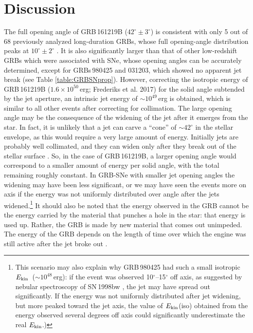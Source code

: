 \documentclass[fleqn,usenatbib]{mnras}
\newcommand{\KE}{$E_{\rm kin}$}
\begin{document}
\section{Discussion}
The full opening angle of GRB\,161219B ($42^\circ \pm 3^\circ$) is consistent with only 5 out of 68 previously analyzed 
long-duration GRBs, whose full opening-angle distribution peaks at 
$10^\circ \pm 2^\circ$ \citep{Fong14}. 
It is also significantly larger than that of other low-redshift 
GRBs which were associated with SNe, whose opening angles can be accurately determined, except for GRBs\,980425 and 
031203, which showed no apparent jet break (see Table \ref{table:GRBSNprop}).  
However, correcting the isotropic 
energy of GRB\,161219B ($1.6 \times 10^{50}$\,erg; Frederiks et al. 2017) for the solid 
angle subtended by the jet aperture, an intrinsic jet energy of 
$\sim 10^{49}$\,erg is obtained, which is similar to all other events after
correcting for collimation.  
The large opening angle may be
the consequence of the widening of the jet after it emerges from the star. In
fact, it is unlikely that a jet can carve a ``cone'' of $\sim 42^\circ$ in the
stellar envelope, as this would require a very large amount of energy. Initially
jets are probably well collimated, and they can widen only after they break out of
the stellar surface \citep{Mizuta13}. So, in the case of GRB\,161219B, a larger
opening angle would correspond to a smaller amount of energy per solid angle, with
the total remaining roughly constant. In GRB-SNe with smaller jet opening angles
the widening may have been less significant, or we may have seen the events more
on axis if the energy was not uniformly distributed over angle after the jets
widened.\footnote{This scenario may also explain why GRB\,980425 had such a
small isotropic \KE\ ($\sim 10^{48}$\,erg): if the event was observed 10$^\circ$--15$^\circ$
off axis, as suggested by nebular spectroscopy of SN\,1998bw
\citep{Maeda02}, the jet may have spread out significantly. 
If the
energy was not uniformly distributed after jet widening, but more peaked toward
the jet axis, the value of \KE(iso) obtained from the energy observed several
degrees off axis could significantly underestimate the real \KE.)} It should
also be noted that the energy observed in the GRB cannot be the energy carried by the
material that punches a hole in the star: that energy is used up. Rather, the GRB is made
by new material that comes out unimpeded. The energy of the GRB depends on the
length of time over which the engine was still active after the jet broke
out \citep{Lazzati12}. 
\end{document}
